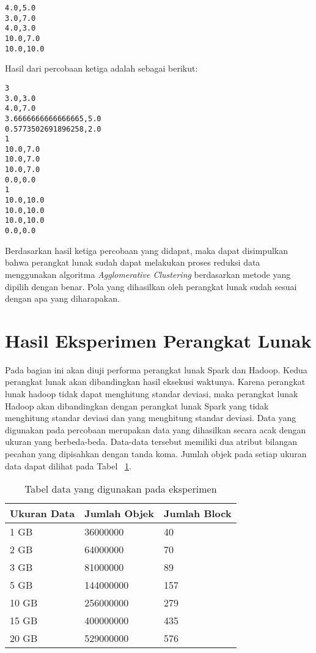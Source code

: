 \begin{itemize}
\begin{verbatim}
4.0,5.0
3.0,7.0
4.0,3.0
10.0,7.0
10.0,10.0
\end{verbatim}

Hasil dari percobaan ketiga adalah sebagai berikut:

\begin{verbatim}
3
3.0,3.0
4.0,7.0
3.6666666666666665,5.0
0.5773502691896258,2.0
1
10.0,7.0
10.0,7.0
10.0,7.0
0.0,0.0
1
10.0,10.0
10.0,10.0
10.0,10.0
0.0,0.0
\end{verbatim}

 
\end{itemize}

Berdasarkan hasil ketiga percobaan yang didapat, maka dapat disimpulkan bahwa perangkat lunak sudah dapat melakukan proses reduksi data menggunakan algoritma \textit{Agglomerative Clustering} berdasarkan metode yang dipilih dengan benar. Pola yang dihasilkan oleh perangkat lunak sudah sesuai dengan apa yang diharapakan.

\section{Hasil Eksperimen Perangkat Lunak}

Pada bagian ini akan diuji performa perangkat lunak Spark dan Hadoop. Kedua perangkat lunak akan dibandingkan hasil eksekusi waktunya. Karena perangkat lunak hadoop tidak dapat menghitung standar deviasi, maka perangkat lunak Hadoop akan dibandingkan dengan perangkat lunak Spark yang tidak menghitung standar deviasi dan yang menghitung standar deviasi. Data yang digunakan pada percobaan merupakan data yang dihasilkan secara acak dengan ukuran yang berbeda-beda. Data-data tersebut memiliki dua atribut bilangan pecahan yang dipisahkan dengan tanda koma. Jumlah objek pada setiap ukuran data dapat dilihat pada Tabel ~\ref{tab:exdata}.\\

\begin{table}[H] 
	\centering 
	\caption{Tabel data yang digunakan pada eksperimen}
	\label{tab:exdata}
	\begin{tabular}{|p{2cm}|p{2cm}|p{4cm}|}
\hline
Ukuran Data & Jumlah Objek  & Jumlah Block\\
\hline
1 GB & 36000000 & 40 \\
\hline
2 GB & 64000000 & 70 \\
\hline
3 GB & 81000000 & 89 \\
\hline
5 GB & 144000000 & 157 \\
\hline
10 GB & 256000000 & 279 \\
\hline
15 GB & 400000000 & 435 \\
\hline
20 GB & 529000000 & 576 \\
\hline
	\end{tabular} 
\end{table}



